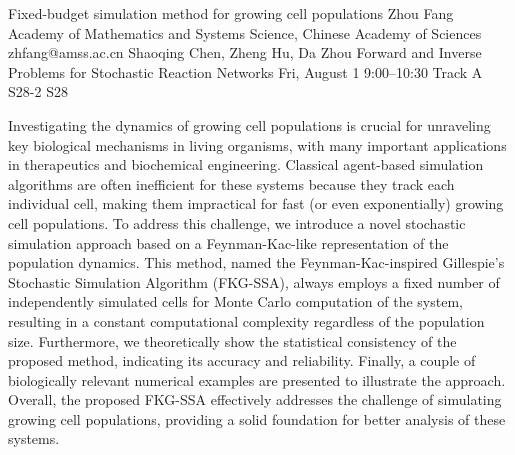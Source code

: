 \begin{talk}
  {Fixed-budget simulation method for growing cell populations}%
  {Zhou Fang}%
  {Academy of Mathematics and Systems Science, Chinese Academy of Sciences}%
  {zhfang@amss.ac.cn}%
  {Shaoqing Chen, Zheng Hu, Da Zhou}%
  {Forward and Inverse Problems for Stochastic Reaction Networks}%
  {Fri, August 1 9:00–10:30 Track A}%
  {S28-2}%
  {S28}%
				
			
Investigating the dynamics of growing cell populations is crucial for unraveling key biological mechanisms in living organisms, with many important applications in therapeutics and biochemical engineering. Classical agent-based simulation algorithms are often inefficient for these systems because
they track each individual cell, making them impractical for fast (or even exponentially) growing
cell populations. To address this challenge, we introduce a novel stochastic simulation approach
based on a Feynman-Kac-like representation of the population dynamics. This method, named the
Feynman-Kac-inspired Gillespie’s Stochastic Simulation Algorithm (FKG-SSA), always employs a
fixed number of independently simulated cells for Monte Carlo computation of the system, resulting in a constant computational complexity regardless of the population size. Furthermore, we
theoretically show the statistical consistency of the proposed method, indicating its accuracy and
reliability. Finally, a couple of biologically relevant numerical examples are presented to illustrate the
approach. Overall, the proposed FKG-SSA effectively addresses the challenge of simulating growing
cell populations, providing a solid foundation for better analysis of these systems.


\end{talk}


